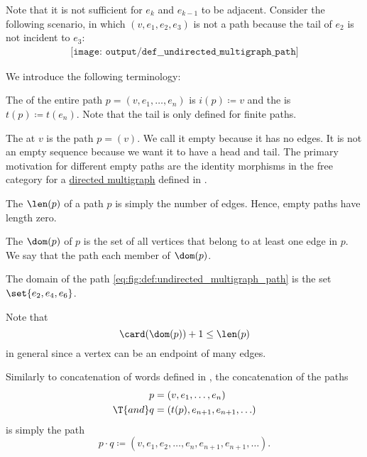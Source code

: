 \begin{definition}
  Note that it is not sufficient for \( e_k \) and \( e_{k-1} \) to be adjacent. Consider the following scenario, in which \( (v, e_1, e_2, e_3) \) is not a path because the tail of \( e_2 \) is not incident to \( e_3 \):
  \begin{equation}\label{eq:def:undirected_multigraph_path/almost_directed}
    \begin{aligned}
      \texttt{[image: output/def\_\_undirected\_multigraph\_path]}
    \end{aligned}
  \end{equation}

  We introduce the following terminology:
  \begin{thmenum}
     The  of the entire path \( p = (v, e_1, \ldots, e_n) \) is \( i(p) \coloneqq v \) and the  is \( t(p) \coloneqq t(e_n) \). Note that the tail is only defined for finite paths.

     The  at \( v \) is the path \( p = (v) \). We call it empty because it has no edges. It is not an empty sequence because we want it to have a head and tail. The primary motivation for different empty paths are the identity morphisms in the free category for a \hyperref[def:directed_multigraph]{directed multigraph} defined in .

     The  \( \len(p) \) of a path \( p \) is simply the number of edges. Hence, empty paths have length zero.

     The  \( \dom(p) \) of \( p \) is the set of all vertices that belong to at least one edge in \( p \). We say that the path  each member of \( \dom(p) \).

    The domain of the path \eqref{eq:fig:def:undirected_multigraph_path} is the set \( \set{ e_2, e_4, e_6 } \).

    Note that
    \begin{equation}\label{eq:def:undirected_multigraph_path/length_and_domain}
      \card(\dom(p)) + 1 \leq \len(p)
    \end{equation}
    in general since a vertex can be an endpoint of many edges.

     Similarly to concatenation of words defined in , the concatenation of the paths
    \begin{align*}
              p &= (v, e_1, \ldots, e_n) \\
      \T{and} q &= (t(p), e_{n+1}, e_{n+1}, \ldots)
    \end{align*}
    is simply the path
    \begin{equation*}
      p \cdot q \coloneqq (v, e_1, e_2, \ldots, e_n, e_{n+1}, e_{n+1}, \ldots).
    \end{equation*}


\end{thmenum}
\end{definition}
